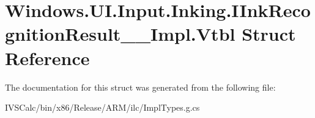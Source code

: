 \hypertarget{struct_windows_1_1_u_i_1_1_input_1_1_inking_1_1_i_ink_recognition_result_____impl_1_1_vtbl}{}\section{Windows.\+U\+I.\+Input.\+Inking.\+I\+Ink\+Recognition\+Result\+\_\+\+\_\+\+Impl.\+Vtbl Struct Reference}
\label{struct_windows_1_1_u_i_1_1_input_1_1_inking_1_1_i_ink_recognition_result_____impl_1_1_vtbl}


The documentation for this struct was generated from the following file\+:\begin{DoxyCompactItemize}
\item 
I\+V\+S\+Calc/bin/x86/\+Release/\+A\+R\+M/ilc/Impl\+Types.\+g.\+cs\end{DoxyCompactItemize}
